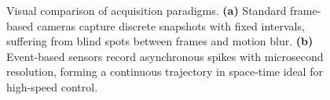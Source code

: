 \begin{figure}[htbp]
    
    \caption{Visual comparison of acquisition paradigms. \textbf{(a)} Standard frame-based 
    cameras capture discrete snapshots with fixed intervals, suffering from blind spots between
     frames and motion blur. \textbf{(b)} Event-based sensors 
     record asynchronous spikes with microsecond resolution, forming a continuous trajectory in 
     space-time ideal for high-speed control.}
    \label{fig:frame_vs_event}
\end{figure}